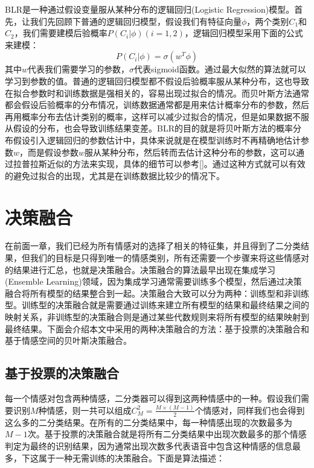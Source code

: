  BLR是一种通过假设变量服从某种分布的逻辑回归(Logistic Regression)模型。首先，让我们先回顾下普通的逻辑回归模型，假设我们有特征向量$\phi$，两个类别$C_1$和$C_2$，我们需要建模后验概率$P(C_i|\phi)(i=1,2)$，逻辑回归模型采用下面的公式来建模：
 \begin{equation}
\label{equ:lagrange_multiplier}
    P(C_i|\phi) = \sigma(w^T\phi)
\end{equation}
其中$w$代表我们需要学习的参数，$\sigma$代表sigmoid函数。通过最大似然的算法就可以学习到参数的值。普通的逻辑回归模型都不假设后验概率服从某种分布，这也导致在拟合参数时和训练数据是强相关的，容易出现过拟合的情况。而贝叶斯方法通常都会假设后验概率的分布情况，训练数据通常都是用来估计概率分布的参数，然后再用概率分布去估计类别的概率，这样可以减少过拟合的情况，但是如果数据不服从假设的分布，也会导致训练结果变差。BLR的目的就是将贝叶斯方法的概率分布假设引入逻辑回归的参数估计中，具体来说就是在模型训练时不再精确地估计参数$w$，而是假设参数$w$服从某种分布，然后转而去估计这种分布的参数，这可以通过拉普拉斯近似的方法来实现，具体的细节可以参考[]。通过这种方式就可以有效的避免过拟合的出现，尤其是在训练数据比较少的情况下。

\section{决策融合}
\label{sec:decision_fusion}
在前面一章，我们已经为所有情感对的选择了相关的特征集，并且得到了二分类结果，但我们的目标是只得到唯一的情感类别，所有还需要一个步骤来将这些情感对的结果进行汇总，也就是决策融合。决策融合的算法最早出现在集成学习(Ensemble Learning)领域，因为集成学习通常需要训练多个模型，然后通过决策融合将所有模型的结果整合到一起。决策融合大致可以分为两种：训练型和非训练型。训练型的决策融合就是需要通过训练来建立所有模型的结果和最终结果之间的映射关系，非训练型的决策融合则是通过某些代数规则来将所有模型的结果映射到最终结果。下面会介绍本文中采用的两种决策融合的方法：基于投票的决策融合和基于情感空间的贝叶斯决策融合。

\subsection{基于投票的决策融合}
\label{ssec:voting_decision_fusion}
每一个情感对包含两种情感，二分类器可以得到这两种情感中的一种。假设我们需要识别$M$种情感，则一共可以组成$C_M^2 = \frac{M \times (M - 1)}{2}$个情感对，同样我们也会得到这么多的二分类结果。在所有的二分类结果中，每一种情感出现的次数最多为$M-1$次。基于投票的决策融合就是将所有二分类结果中出现次数最多的那个情感判定为最终的识别结果，因为通常出现次数多代表语音中包含这种情感的信息最多，下这属于一种无需训练的决策融合。下面是算法描述：

